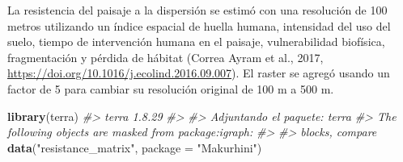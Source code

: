 \documentclass[
]{book}
\newenvironment{Shaded}{\begin{snugshade}}{\end{snugshade}}
\newcommand{\AttributeTok}[1]{\textcolor[rgb]{0.13,0.29,0.53}{#1}}
\newcommand{\CommentTok}[1]{\textcolor[rgb]{0.56,0.35,0.01}{\textit{#1}}}
\newcommand{\FunctionTok}[1]{\textcolor[rgb]{0.13,0.29,0.53}{\textbf{#1}}}
\newcommand{\NormalTok}[1]{#1}
\newcommand{\StringTok}[1]{\textcolor[rgb]{0.31,0.60,0.02}{#1}}
\begin{document}
La resistencia del paisaje a la dispersión se estimó con una resolución de 100 metros utilizando un índice espacial de huella humana, intensidad del uso del suelo, tiempo de intervención humana en el paisaje, vulnerabilidad biofísica, fragmentación y pérdida de hábitat (Correa Ayram et al., 2017, \url{https://doi.org/10.1016/j.ecolind.2016.09.007}). El raster se agregó usando un factor de 5 para cambiar su resolución original de 100 m a 500 m.

\begin{Shaded}
\begin{Highlighting}[]
\FunctionTok{library}\NormalTok{(terra)}
\CommentTok{\#\textgreater{} terra 1.8.29}
\CommentTok{\#\textgreater{} }
\CommentTok{\#\textgreater{} Adjuntando el paquete: \textquotesingle{}terra\textquotesingle{}}
\CommentTok{\#\textgreater{} The following objects are masked from \textquotesingle{}package:igraph\textquotesingle{}:}
\CommentTok{\#\textgreater{} }
\CommentTok{\#\textgreater{}     blocks, compare}
\FunctionTok{data}\NormalTok{(}\StringTok{"resistance\_matrix"}\NormalTok{, }\AttributeTok{package =} \StringTok{"Makurhini"}\NormalTok{)}


\end{Highlighting}
\end{Shaded}
\end{document}
